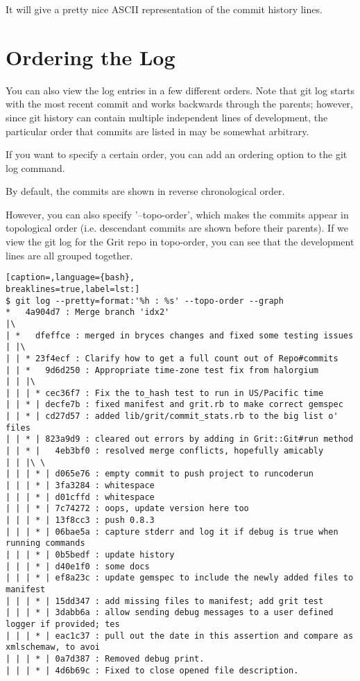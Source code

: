 It will give a pretty nice ASCII representation of the commit history lines.

\section{Ordering the Log}
You can also view the log entries in a few different orders. Note that git log
starts with the most recent commit and works backwards through the parents;
however, since git history can contain multiple independent lines of
development, the particular order that commits are listed in may be somewhat
arbitrary.

If you want to specify a certain order, you can add an ordering option to the
git log command.

By default, the commits are shown in reverse chronological order.

However, you can also specify '--topo-order', which makes the commits appear in
topological order (i.e. descendant commits are shown before their parents). If
we view the git log for the Grit repo in topo-order, you can see that the
development lines are all grouped together.
\lstset{basicstyle=\scriptsize, numbers=none, captionpos=b, tabsize=4}
\begin{lstlisting}[caption=,language={bash},
breaklines=true,label=lst:]
$ git log --pretty=format:'%h : %s' --topo-order --graph
*   4a904d7 : Merge branch 'idx2'
|\  
| *   dfeffce : merged in bryces changes and fixed some testing issues
| |\  
| | * 23f4ecf : Clarify how to get a full count out of Repo#commits
| | *   9d6d250 : Appropriate time-zone test fix from halorgium
| | |\  
| | | * cec36f7 : Fix the to_hash test to run in US/Pacific time
| | * | decfe7b : fixed manifest and grit.rb to make correct gemspec
| | * | cd27d57 : added lib/grit/commit_stats.rb to the big list o' files
| | * | 823a9d9 : cleared out errors by adding in Grit::Git#run method
| | * |   4eb3bf0 : resolved merge conflicts, hopefully amicably
| | |\ \  
| | | * | d065e76 : empty commit to push project to runcoderun
| | | * | 3fa3284 : whitespace
| | | * | d01cffd : whitespace
| | | * | 7c74272 : oops, update version here too
| | | * | 13f8cc3 : push 0.8.3
| | | * | 06bae5a : capture stderr and log it if debug is true when running commands
| | | * | 0b5bedf : update history
| | | * | d40e1f0 : some docs
| | | * | ef8a23c : update gemspec to include the newly added files to manifest
| | | * | 15dd347 : add missing files to manifest; add grit test
| | | * | 3dabb6a : allow sending debug messages to a user defined logger if provided; tes
| | | * | eac1c37 : pull out the date in this assertion and compare as xmlschemaw, to avoi
| | | * | 0a7d387 : Removed debug print.
| | | * | 4d6b69c : Fixed to close opened file description.
\end{lstlisting}

